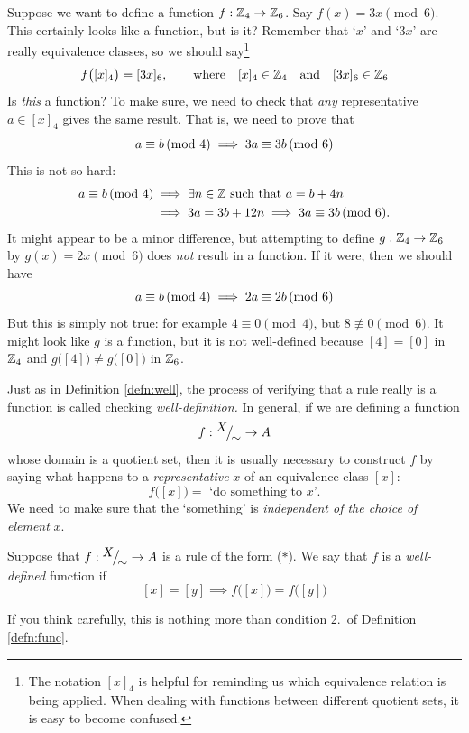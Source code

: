 Suppose we want to define a function $f:\mathbb{Z}_4\to\mathbb{Z}_6$. Say $f(x)=3x\pmod 6$. This certainly looks like a function, but is it? Remember that `$x$' and `$3x$' are really equivalence classes, so we should say\footnote{The notation $[x]_4$ is helpful for reminding us which equivalence relation is being applied. When dealing with functions between different quotient sets, it is easy to become confused.}
\[
	f\bigl([x]_4\bigr)=[3x]_6,\qquad\text{where}\quad [x]_4\in\mathbb{Z}_4\quad\text{and}\quad [3x]_6\in\mathbb{Z}_6
\]
Is \emph{this} a function? To make sure, we need to check that \emph{any} representative $a\in[x]_4$ gives the same result. That is, we need to prove that
\[
	a\equiv b\negthickspace\pmod{4}\implies 3a\equiv 3b\negthickspace\pmod{6}
\]
This is not so hard:
\begin{align*}
	a\equiv b\negthickspace\pmod{4}&\implies \exists n\in\mathbb{Z}\text{ such that }a=b+4n\\
	&\implies 3a=3b+12n\implies 3a\equiv 3b\negthickspace\pmod{6}.
\end{align*}
It might appear to be a minor difference, but attempting to define $g:\mathbb{Z}_4\to\mathbb{Z}_6$ by $g(x)=2x\pmod 6$ does \emph{not} result in a function. If it were, then we should have
\[
	a\equiv b\negthickspace\pmod{4}\implies 2a\equiv 2b\negthickspace\pmod{6}
\]
But this is simply not true: for example $4\equiv 0\pmod 4$, but $8\not\equiv 0\pmod 6$. It might look like $g$ is a function, but it is not well-defined because $[4]=[0]$ in $\mathbb{Z}_4$ and $g\bigl([4]\bigr)\neq g\bigl([0]\bigr)$ in $\mathbb{Z}_6$.\par

Just as in Definition \ref{defn:well}, the process of verifying that a rule really is a function is called checking \emph{well-definition.} In general, if we are defining a function
\[
	f:{}^{\textstyle {X}}\!\big/_{\textstyle \!{\sim}}\to A
\]
whose domain is a quotient set, then it is usually necessary to construct $f$ by saying what happens to a \emph{representative} $x$ of an equivalence class $[x]$:
\[
	f\bigl([x]\bigr)=\text{ `do something to $x$'.}\tag{$\ast$}
\]
We need to make sure that the `something' is \emph{independent of the choice of element} $x$.

\begin{defn}{}{}
	Suppose that $f:{}^{\textstyle {X}}\!\big/_{\textstyle \!{\sim}}\to A$ is a rule of the form ($\ast$). We say that $f$ is a \emph{well-defined} function if
	\[
		[x]=[y]\implies f\bigl([x]\bigr)=f\bigl([y]\bigr)
	\]
\end{defn}

If you think carefully, this is nothing more than condition 2.\ of Definition \ref{defn:func}.

